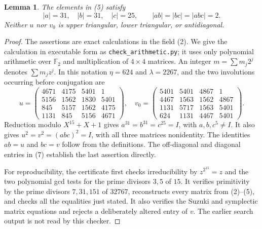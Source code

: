 \documentclass[11pt,a4paper]{article}
\newtheorem{lemma}[theorem]{Lemma}
\newcommand{\F}{\mathbb F}
\begin{document}
\begin{lemma}\label{arithmetic}
The elements in (5) satisfy
\[
 |a|=31,\quad |b|=31,\quad |c|=25,\qquad
 |ab|=|bc|=|abc|=2.
 \tag{6}
\]
Neither $u$ nor $v_0$ is upper triangular, lower triangular, or
antidiagonal.
\end{lemma}
\begin{proof}
The assertions are exact calculations in the field (2). We give the
calculation in executable form as \texttt{check\_arithmetic.py}; it
uses only polynomial arithmetic over $\F_2$ and multiplication of
$4\times4$ matrices. An integer $m=\sum m_j2^j$ denotes
$\sum m_jz^j$. In this notation $\eta=624$ and $\lambda=2267$,
and the two involutions occurring before conjugation are
\[
 u=\begin{pmatrix}
 4671&4175&5401&1\\5156&1562&1830&5401\\
 845&5157&1562&4175\\1131&845&5156&4671
 \end{pmatrix},\quad
 v_0=\begin{pmatrix}
 5401&5401&4867&1\\4467&1563&1562&4867\\
 1131&5717&1563&5401\\624&1131&4467&5401
 \end{pmatrix}.
 \tag{7}
\]
Reduction modulo $X^{15}+X+1$ gives $a^{31}=b^{31}=c^{25}=I$,
with $a,b,c^5\ne I$. It also gives
$u^2=v^2=(abc)^2=I$, with all three matrices nonidentity.
The identities $ab=u$ and $bc=v$ follow from the definitions.
The off-diagonal and diagonal entries in (7) establish the last
assertion directly.

For reproducibility, the certificate first checks irreducibility by
$z^{2^{15}}=z$ and the two polynomial gcd tests for the prime divisors
$3,5$ of $15$. It verifies primitivity by the prime divisors
$7,31,151$ of $32767$, reconstructs every matrix from (2)--(5), and
checks all the equalities just stated. It also verifies the Suzuki
and symplectic matrix equations and rejects a deliberately altered
entry of $v$. The earlier search output is not read by this checker.
\end{proof}
\end{document}
